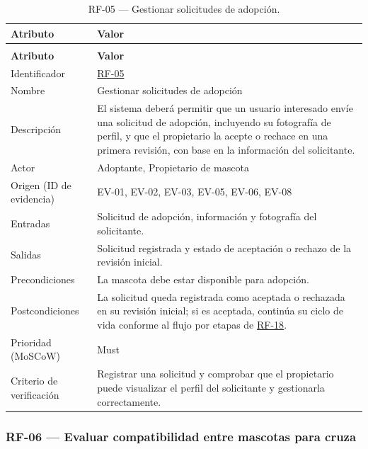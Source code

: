 \documentclass[journal,onecolumn]{IEEEtran}
\makeatletter
\newenvironment{atributos}[2]{%
	\small
	\begin{longtable}{@{}>{\raggedright\arraybackslash}p{4.2cm} >{\raggedright\arraybackslash}p{11.2cm}@{}}
		\caption{#2}\label{tab:#1}\\
		\toprule
		\textbf{Atributo} & \textbf{Valor} \\
		\midrule
		\endfirsthead
		\multicolumn{2}{@{}l}{\small\itshape (continuación)}\\
		\toprule
		\textbf{Atributo} & \textbf{Valor} \\
		\midrule
		\endhead
		\bottomrule
		\endlastfoot
	}{%
	\end{longtable}
	\normalsize
}
\makeatother
\begin{document}
	\begin{atributos}{RF-05}{RF-05 --- Gestionar solicitudes de adopción.}
		Identificador & \hyperref[tab:RF-05]{RF-05} \\
		Nombre & Gestionar solicitudes de adopción \\
		Descripción & El sistema deberá permitir que un usuario interesado envíe una solicitud de adopción, incluyendo su fotografía de perfil, y que el propietario la acepte o rechace en una primera revisión, con base en la información del solicitante. \\
		Actor & Adoptante, Propietario de mascota \\
		Origen (ID de evidencia) & EV-01, EV-02, EV-03, EV-05, EV-06, EV-08 \\
		Entradas & Solicitud de adopción, información y fotografía del solicitante. \\
		Salidas & Solicitud registrada y estado de aceptación o rechazo de la revisión inicial. \\
		Precondiciones & La mascota debe estar disponible para adopción. \\
		Postcondiciones & La solicitud queda registrada como aceptada o rechazada en su revisión inicial; si es aceptada, continúa su ciclo de vida conforme al flujo por etapas de \hyperref[tab:RF-18]{RF-18}. \\
		Prioridad (MoSCoW) & Must \\
		Criterio de verificación & Registrar una solicitud y comprobar que el propietario puede visualizar el perfil del solicitante y gestionarla correctamente. \\
	\end{atributos}
	
	\subsubsection{RF-06 --- Evaluar compatibilidad entre mascotas para cruza}
	
\end{document}
